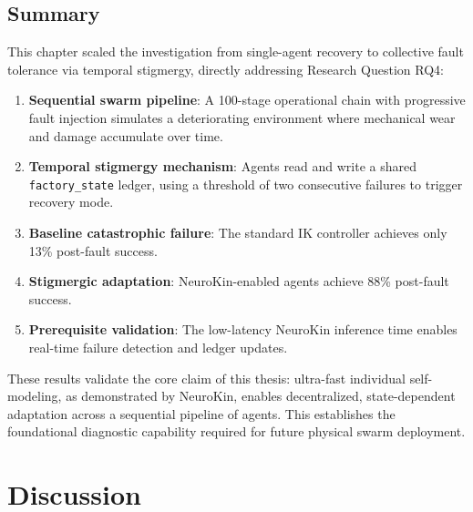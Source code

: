 \documentclass[12pt,a4paper,oneside]{report}
\begin{document}
\section{Summary}

This chapter scaled the investigation from single-agent recovery to collective fault tolerance via temporal stigmergy, directly addressing Research Question RQ4:

\begin{enumerate}
    \item \textbf{Sequential swarm pipeline}: A 100-stage operational chain with progressive fault injection simulates a deteriorating environment where mechanical wear and damage accumulate over time.
    \item \textbf{Temporal stigmergy mechanism}: Agents read and write a shared \texttt{factory\_state} ledger, using a threshold of two consecutive failures to trigger recovery mode.
    \item \textbf{Baseline catastrophic failure}: The standard IK controller achieves only 13\% post-fault success.
    \item \textbf{Stigmergic adaptation}: NeuroKin-enabled agents achieve 88\% post-fault success.
    \item \textbf{Prerequisite validation}: The low-latency NeuroKin inference time enables real-time failure detection and ledger updates.
\end{enumerate}

These results validate the core claim of this thesis: ultra-fast individual self-modeling, as demonstrated by NeuroKin, enables decentralized, state-dependent adaptation across a sequential pipeline of agents. This establishes the foundational diagnostic capability required for future physical swarm deployment.





















\chapter{Discussion}
\label{chap:discussion}
\end{document}
